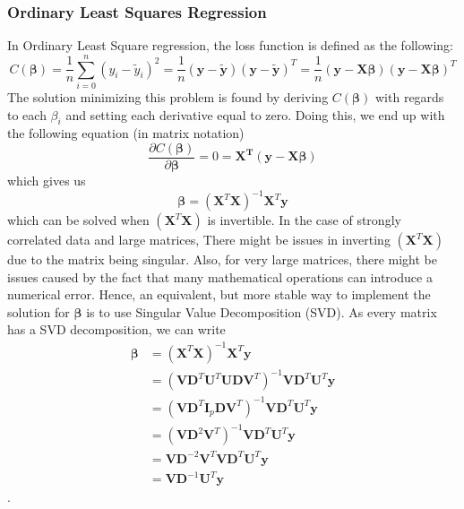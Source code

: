 \documentclass[11pt,a4paper,titlepage]{article}
\begin{document}
\subsubsection{Ordinary Least Squares Regression}
In Ordinary Least Square regression, the loss function is defined as the following:
\begin{equation*}
C(\bm{\beta})= \frac{1}{n}\sum_{i=0}^n\left( y_i-\tilde y_i \right)^2
=\frac{1}{n}(\bm{y}-\bm{\tilde y})(\bm{y}-\bm{\tilde y})^T=
\frac{1}{n}(\bm{y}-\bm{X\beta})(\bm{y}-\bm{X\beta})^T
\end{equation*}
The solution minimizing this problem is found by deriving $C(\bm{\beta})$ with regards to each $\beta_i$ and setting each derivative equal to zero. Doing this, we end up with the following equation (in matrix notation)
\begin{equation*}
\frac{\partial C(\bm{\beta})}{\partial\bm{\beta}}=0=\bm{X^T}(\bm{y}-\bm{X\beta})
\end{equation*}
which gives us
\begin{equation*}
\bm{\beta}=(\bm{X}^T\bm{X})^{-1}\bm{X}^T\bm{y}
\end{equation*}
which can be solved when $(\bm{X}^T\bm{X})$ is invertible. In the case of strongly correlated data and large matrices, There might be issues in inverting $(\bm{X}^T\bm{X})$ due to the matrix being singular. Also, for very large matrices, there might be issues caused by the fact that many mathematical operations can introduce a numerical error. Hence, an equivalent, but more stable way to implement the solution for $\bm{\beta}$ is to use Singular Value Decomposition (SVD). As every matrix has a SVD decomposition, we can write
\begin{equation}\label{SVD_OLS}
\begin{split}\bm{\beta} & =\left(\bm{X}^T\bm{X}\right)^{-1}\bm{X}^T\bm{y}\\
& = \left(\bm{V}\bm{D}^T\bm{U}^T\bm{U}\bm{D}\bm{V}^T\right)^{-1}\bm{V}\bm{D}^T\bm{U}^T\bm{y}\\
& = \left(\bm{V}\bm{D}^T\bm{I}_p\bm{D}\bm{V}^T\right)^{-1}\bm{V}\bm{D}^T\bm{U}^T\bm{y}\\
& = \left(\bm{V}\bm{D}^2\bm{V}^T\right)^{-1}\bm{V}\bm{D}^T\bm{U}^T\bm{y}\\
& = \bm{V}\bm{D}^{-2}\bm{V}^T\bm{V}\bm{D}^T\bm{U}^T\bm{y}\\
& = \bm{V}\bm{D}^{-1}\bm{U}^T\bm{y}\end{split}
\end{equation}.
\end{document}
